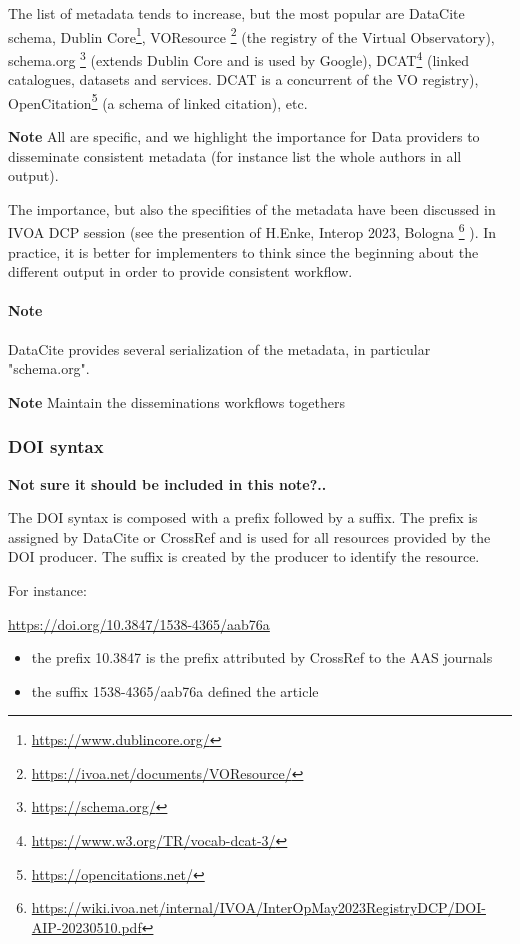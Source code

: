 \documentclass[11pt,a4paper]{ivoa}
\newcommand{\important}[1]{
	\begin{bigdescription}
		\item \color{ivoacolor}\textbf{Note} #1
	\end{bigdescription}
}
\begin{document}
The list of metadata tends to increase, but the most popular are DataCite schema, Dublin Core\footnote{\url{https://www.dublincore.org/}}, VOResource \footnote{\url{https://ivoa.net/documents/VOResource/}} (the registry of the Virtual Observatory), schema.org \footnote{\url{https://schema.org/}} (extends Dublin Core and is used by Google), DCAT\footnote{\url{https://www.w3.org/TR/vocab-dcat-3/}} (linked catalogues, datasets and services. DCAT is a concurrent of the VO registry), OpenCitation\footnote{\url{https://opencitations.net/}} (a schema of linked citation),  etc.

\important{
All are specific, and we highlight the importance for Data providers to disseminate consistent metadata
(for instance list the whole authors in all output).
}

The importance, but also the specifities of the metadata have been discussed in IVOA DCP session (see the presention of H.Enke, Interop 2023, Bologna \footnote{\url{https://wiki.ivoa.net/internal/IVOA/InterOpMay2023RegistryDCP/DOI-AIP-20230510.pdf}}
). In practice, it is better for implementers to think since the beginning about the different output in order to provide consistent workflow.

\paragraph{Note} DataCite provides several serialization of the metadata, in particular "schema.org".

\important{
Maintain the disseminations workflows togethers
}


\subsubsection{DOI syntax}
\textbf{\color{red} Not sure it should be included in this note?..}

The DOI syntax is composed with a prefix followed by a suffix.
The prefix is assigned by DataCite or CrossRef and is used for all resources provided by the DOI producer. The suffix is created by the producer to identify the resource.

For instance: 

\url{https://doi.org/10.3847/1538-4365/aab76a}

\begin{itemize}
	\item the prefix 10.3847 is the prefix attributed by CrossRef to the AAS journals 
	\item the suffix 1538-4365/aab76a defined the article 
\end{itemize}
\end{document}

